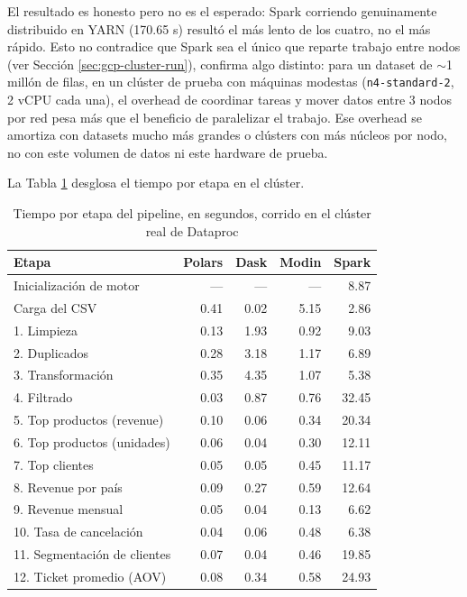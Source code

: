 El resultado es honesto pero no es el esperado: Spark corriendo genuinamente distribuido en YARN (170.65 s) resultó el más lento de los cuatro, no el más rápido. Esto no contradice que Spark sea el único que reparte trabajo entre nodos (ver Sección \ref{sec:gcp-cluster-run}), confirma algo distinto: para un dataset de $\sim$1 millón de filas, en un clúster de prueba con máquinas modestas (\texttt{n4-standard-2}, 2 vCPU cada una), el overhead de coordinar tareas y mover datos entre 3 nodos por red pesa más que el beneficio de paralelizar el trabajo. Ese overhead se amortiza con datasets mucho más grandes o clústers con más núcleos por nodo, no con este volumen de datos ni este hardware de prueba.

La Tabla \ref{tab:benchmark-etapas-cluster} desglosa el tiempo por etapa en el clúster.

\begin{table}[H]
\centering
\small
\begin{tabular}{lrrrr}
\toprule
\textbf{Etapa} & \textbf{Polars} & \textbf{Dask} & \textbf{Modin} & \textbf{Spark} \\
\midrule
Inicialización de motor & --- & --- & --- & 8.87 \\
Carga del CSV & 0.41 & 0.02 & 5.15 & 2.86 \\
1. Limpieza & 0.13 & 1.93 & 0.92 & 9.03 \\
2. Duplicados & 0.28 & 3.18 & 1.17 & 6.89 \\
3. Transformación & 0.35 & 4.35 & 1.07 & 5.38 \\
4. Filtrado & 0.03 & 0.87 & 0.76 & 32.45 \\
5. Top productos (revenue) & 0.10 & 0.06 & 0.34 & 20.34 \\
6. Top productos (unidades) & 0.06 & 0.04 & 0.30 & 12.11 \\
7. Top clientes & 0.05 & 0.05 & 0.45 & 11.17 \\
8. Revenue por país & 0.09 & 0.27 & 0.59 & 12.64 \\
9. Revenue mensual & 0.05 & 0.04 & 0.13 & 6.62 \\
10. Tasa de cancelación & 0.04 & 0.06 & 0.48 & 6.38 \\
11. Segmentación de clientes & 0.07 & 0.04 & 0.46 & 19.85 \\
12. Ticket promedio (AOV) & 0.08 & 0.34 & 0.58 & 24.93 \\
\bottomrule
\end{tabular}
\caption{Tiempo por etapa del pipeline, en segundos, corrido en el clúster real de Dataproc}
\label{tab:benchmark-etapas-cluster}
\end{table}

